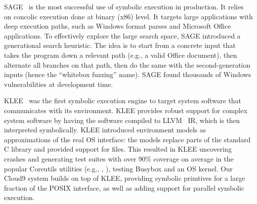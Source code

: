 



SAGE~\cite{sage2012,godefroid:fuzz} is the most successful use of symbolic execution in production.  It relies on concolic execution done at binary (x86) level.  It targets large applications with deep execution paths, such as Windows format parses and Microsoft Office applications.  To effectively explore the large search space, SAGE introduced a generational search heuristic.  The idea is to start from a concrete input that takes the program down a relevant path (e.g., a valid Office document), then alternate all branches on that path, then do the same with the second-generation inputs (hence the ``whitebox fuzzing'' name).
%
SAGE found thousands of Windows vulnerabilities at development time.



KLEE~\cite{klee} was the first symbolic execution engine to target system software that communicates with its environment.  KLEE provides robust support for complex system software by having the software compiled to LLVM~\cite{llvm} IR, which is then interpreted symbolically.  KLEE introduced environment models as approximations of the real OS interface: the models replace parts of the standard C library and provided support for files.
%
This resulted in KLEE uncovering crashes and generating test suites with over 90\% coverage on average in the popular Coreutils utilities (e.g., , ), testing Busybox and an OS kernel.
%
Our Cloud9 system builds on top of KLEE, providing symbolic primtives for a large fraction of the POSIX interface, as well as adding support for parallel symbolic execution.

